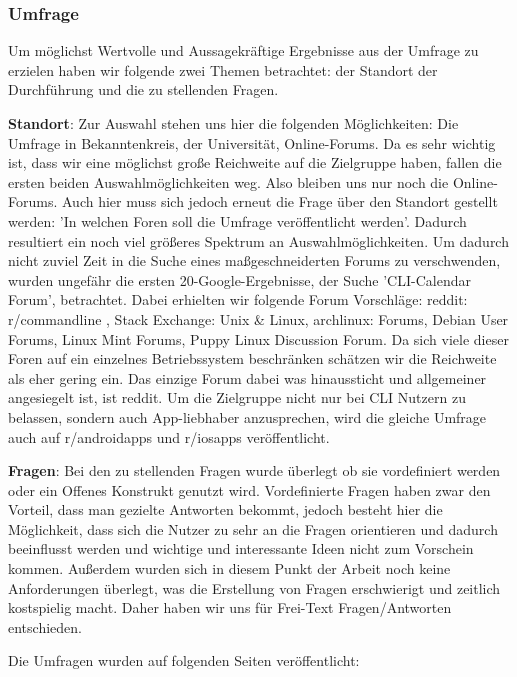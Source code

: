 \subsubsection{Umfrage}
Um möglichst Wertvolle und Aussagekräftige Ergebnisse aus der Umfrage zu erzielen haben wir folgende zwei Themen betrachtet: der Standort der Durchführung und die zu stellenden Fragen.

\myNewSection
\textbf{Standort}: Zur Auswahl stehen uns hier die folgenden Möglichkeiten: Die Umfrage in Bekanntenkreis, der Universität, Online-Forums. \newline
Da es sehr wichtig ist, dass wir eine möglichst große Reichweite auf die Zielgruppe haben, fallen die ersten beiden Auswahlmöglichkeiten weg. \newline
Also bleiben uns nur noch die Online-Forums. Auch hier muss sich jedoch erneut die Frage über den Standort gestellt werden: 'In welchen Foren soll die Umfrage veröffentlicht werden'. Dadurch resultiert ein noch viel größeres Spektrum an Auswahlmöglichkeiten. Um dadurch nicht zuviel Zeit in die Suche eines maßgeschneiderten Forums zu verschwenden, wurden ungefähr die ersten 20-Google-Ergebnisse, der Suche 'CLI-Calendar Forum', betrachtet. Dabei erhielten wir folgende Forum Vorschläge: reddit: r/commandline\cite{rCommandLine} , Stack Exchange: Unix \& Linux\cite{unixAndLinux}, archlinux: Forums\cite{archlinux}, Debian User Forums\cite{debianUserForums}, Linux Mint Forums\cite{linuxMintForums}, Puppy Linux Discussion Forum\cite{puppyLinux}. Da sich viele dieser Foren auf ein einzelnes Betriebssystem beschränken schätzen wir die Reichweite als eher gering ein. Das einzige Forum dabei was hinaussticht und allgemeiner angesiegelt ist, ist reddit. \newline
Um die Zielgruppe nicht nur bei CLI Nutzern zu belassen, sondern auch App-liebhaber anzusprechen, wird die gleiche Umfrage auch auf r/androidapps\cite{rAndroidapps} und r/iosapps\cite{rIOSapps} veröffentlicht.

\myNewSection
\textbf{Fragen}: Bei den zu stellenden Fragen wurde überlegt ob sie vordefiniert werden oder ein Offenes Konstrukt genutzt wird. Vordefinierte Fragen haben zwar den Vorteil, dass man gezielte Antworten bekommt, jedoch besteht hier die Möglichkeit, dass sich die Nutzer zu sehr an die Fragen orientieren und dadurch beeinflusst werden und wichtige und interessante Ideen nicht zum Vorschein kommen. Außerdem wurden sich in diesem Punkt der Arbeit noch keine Anforderungen überlegt, was die Erstellung von Fragen erschwierigt und zeitlich kostspielig macht. Daher haben wir uns für Frei-Text Fragen/Antworten entschieden.

\myNewSection
Die Umfragen wurden auf folgenden Seiten veröffentlicht: \myTodo
